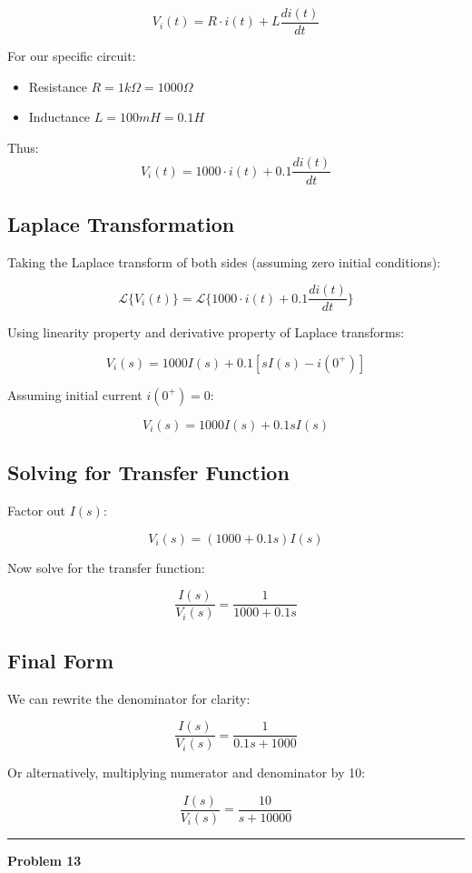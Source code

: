 \documentclass[11pt,letterpaper]{article}
\begin{document}
\[
V_i(t) = R \cdot i(t) + L \frac{di(t)}{dt}
\]

For our specific circuit:
\begin{itemize}
\item Resistance $R = 1k\Omega = 1000\Omega$
\item Inductance $L = 100mH = 0.1H$
\end{itemize}

Thus:
\[
V_i(t) = 1000 \cdot i(t) + 0.1 \frac{di(t)}{dt}
\]

\subsection*{Laplace Transformation}
Taking the Laplace transform of both sides (assuming zero initial conditions):

\[
\mathcal{L}\{V_i(t)\} = \mathcal{L}\{1000 \cdot i(t) + 0.1 \frac{di(t)}{dt}\}
\]

Using linearity property and derivative property of Laplace transforms:

\[
V_i(s) = 1000 I(s) + 0.1 [sI(s) - i(0^+)]
\]

Assuming initial current $i(0^+) = 0$:

\[
V_i(s) = 1000 I(s) + 0.1 s I(s)
\]

\subsection*{Solving for Transfer Function}
Factor out $I(s)$:

\[
V_i(s) = (1000 + 0.1s) I(s)
\]

Now solve for the transfer function:

\[
\frac{I(s)}{V_i(s)} = \frac{1}{1000 + 0.1s}
\]

\subsection*{Final Form}
We can rewrite the denominator for clarity:

\[
\frac{I(s)}{V_i(s)} = \frac{1}{0.1s + 1000}
\]

Or alternatively, multiplying numerator and denominator by 10:

\[
\frac{I(s)}{V_i(s)} = \frac{10}{s + 10000}
\]

\begin{center}
\end{center}


\clearpage
\noindent\rule{\textwidth}{1pt}
\textbf{Problem 13}\\
\end{document}
